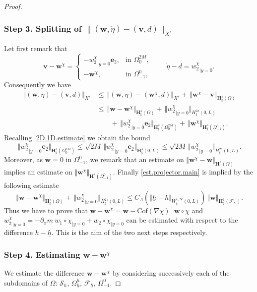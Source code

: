\documentclass[JEP,XML,SOM,Unicode,NoFloatCountersInSection]{cedram}
\let\mathcal\mathscr
\theoremstyle{remark}
\theoremstyle{definition}
\newcommand{\norme}[1]{\,\Vert #1\Vert}
\newcommand{\vnorme}[1]{\Vert #1\Vert}
\newcommand{\vg}{\boldsymbol{v}}
\newcommand{\wg}{\boldsymbol{w}}
\newcommand{\BS}[1]{\boldsymbol{#1}}
\let\CM\Omega
\newcommand{\etap}{\dot{\eta}}
\newcommand{\hb}{{\underline{h}}}
\newcommand{\Cof}{\mathrm{Cof}}
\begin{document}
\begin{proof}
\subsubsection*{Step 3. Splitting of $\|(\wg,\etap) - (\vg,d)\|_{X^s}$}
Let first remark that
\[\vg - \wg^\chi =\begin{cases}
-{w_{2}^\chi}_{|{y=0}}\BS{e}_{2},&\text{in } \Omega^{2M}_{0},\\
-\wg^\chi, & \text{in }\Omega^{0}_{-1},
\end{cases}
\qquad
\etap -d ={w_{2}^\chi}_{|{y=0}}.
\]
Consequently we have
\[
\begin{aligned}
\norme{(\wg,\etap) - (\vg,d)}_{X^s}&\leq \norme{(\wg,\etap) - (\wg^\chi,d)}_{X^s} +\norme{\wg^\chi - \vg}_{\BS{H}^{s}_{\sharp}(\CM)}\\
&\leq \norme{\wg -\wg^\chi}_{\BS{H}^{s}_{\sharp}(\CM)} + \norme{{w_{2}^\chi}_{|{y=0}}}_{H^{2s}_{\sharp}(0,L)} \\
& \qquad + \norme{{w_{2}^\chi}_{|{y=0}}\BS{e}_{2}}_{\BS{H}^{s}_{\sharp}(\Omega^{2M}_{0})}+\norme{\wg^\chi}_{\BS{H}^{s}_{\sharp}(\Omega_{-1}^{0})}.
\end{aligned}
\]
Recalling \eqref{2D.1D.estimate} we obtain the bound
\[\norme{{w_{2}^\chi}_{|{y=0}}\BS{e}_{2}}_{\BS{H}_\sharp^{s}(\Omega_{0}^{2M})}\leq \sqrt{2M}\norme{{w_{2}^\chi}_{|{y=0}}\BS{e}_{2}}_{\BS{H}_\sharp^{s}(0,L)}\leq \sqrt{2M}\norme{{w_{2}^\chi}_{|{y=0}}}_{H_\sharp^{2s}(0,L)}.\]
Moreover, as $\wg=0$ in $\Omega^{0}_{-1}$, we remark that an estimate on $\vnorme{\wg^\chi - \wg}_{\BS{H}^{s}(\CM)}$ implies an estimate on $\vnorme{\wg^\chi}_{\BS{H}^{s}(\Omega_{-1}^{0})}$. Finally \eqref{est.projector.main} is implied by the following estimate
\begin{equation}\label{est.projector.final}
\norme{\wg -\wg^\chi}_{\BS{H}^{s}_{\sharp}(\CM)}+ \norme{{w_{2}^\chi}_{|{y=0}}}_{H^{2s}_{\sharp}(0,L)}
\leq C_{A}(\vnorme{\hb -h }_{W^{1,\infty}_{\sharp}(0,L)})\norme{\wg}_{\BS{H}^{1}_{\sharp}(\mathcal{F}^{-}_{h})}.
\end{equation}
Thus we have to prove that $\wg -\wg^\chi=\wg-\Cof(\nabla \chi)^{\top}\wg\circ \chi $ and ${w_{2}^\chi}_{|{y=0}}=-\partial_x m \ w_{1}\circ\chi_{|{y=0}}+w_{2}\circ\chi_{|{y=0}}$ can be estimated with respect to the difference $h-\hb$. This is the aim of the two next steps respectively.

\subsubsection*{Step 4. Estimating $\wg -\wg^\chi$}
We estimate the difference $\wg - \wg^{\chi}$
by considering successively each of the subdomains of $\Omega$: $\mathcal{S}_{h}$, $\Omega_{\hb}^{h}$, $\mathcal{F}_{\hb}$, $\Omega_{-1}^{0}$.


\end{proof}
\end{document}
